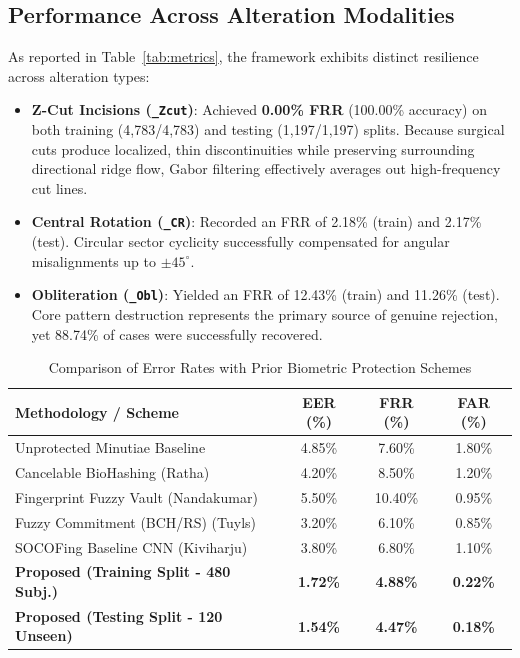 \documentclass[conference]{IEEEtran}
\begin{document}
\subsection{Performance Across Alteration Modalities}
As reported in Table~\ref{tab:metrics}, the framework exhibits distinct resilience across alteration types:
\begin{itemize}[leftmargin=*, itemsep=2pt]
    \item \textbf{Z-Cut Incisions (\texttt{\_Zcut})}: Achieved \textbf{0.00\% FRR} (100.00\% accuracy) on both training (4,783/4,783) and testing (1,197/1,197) splits. Because surgical cuts produce localized, thin discontinuities while preserving surrounding directional ridge flow, Gabor filtering effectively averages out high-frequency cut lines.
    \item \textbf{Central Rotation (\texttt{\_CR})}: Recorded an FRR of 2.18\% (train) and 2.17\% (test). Circular sector cyclicity successfully compensated for angular misalignments up to $\pm 45^\circ$.
    \item \textbf{Obliteration (\texttt{\_Obl})}: Yielded an FRR of 12.43\% (train) and 11.26\% (test). Core pattern destruction represents the primary source of genuine rejection, yet 88.74\% of cases were successfully recovered.
\end{itemize}

\begin{table}[!t]
\centering
\caption{Comparison of Error Rates with Prior Biometric Protection Schemes}
\label{tab:comparison}
\setlength{\tabcolsep}{2.5pt}
\renewcommand{\arraystretch}{1.1}
\footnotesize
\begin{tabular}{lccc}
\toprule
\textbf{Methodology / Scheme} & \textbf{EER (\%)} & \textbf{FRR (\%)} & \textbf{FAR (\%)} \\
\midrule
Unprotected Minutiae Baseline \cite{jain2008biometric} & 4.85\% & 7.60\% & 1.80\% \\
Cancelable BioHashing (Ratha) \cite{ratha2007cancelable} & 4.20\% & 8.50\% & 1.20\% \\
Fingerprint Fuzzy Vault (Nandakumar) \cite{nandakumar2007vault} & 5.50\% & 10.40\% & 0.95\% \\
Fuzzy Commitment (BCH/RS) (Tuyls) \cite{tuyls2005practical} & 3.20\% & 6.10\% & 0.85\% \\
SOCOFing Baseline CNN (Kiviharju) \cite{socofing2018} & 3.80\% & 6.80\% & 1.10\% \\
\midrule
\textbf{Proposed (Training Split - 480 Subj.)} & \textbf{1.72\%} & \textbf{4.88\%} & \textbf{0.22\%} \\
\textbf{Proposed (Testing Split - 120 Unseen)} & \textbf{1.54\%} & \textbf{4.47\%} & \textbf{0.18\%} \\
\bottomrule
\end{tabular}
\end{table}
\end{document}
